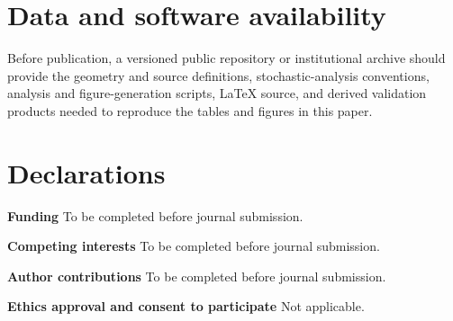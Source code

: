 \documentclass[11pt]{article}
\begin{document}
\section*{Data and software availability}
Before publication, a versioned public repository or institutional archive should provide the geometry and source definitions, stochastic-analysis conventions, analysis and figure-generation scripts, LaTeX source, and derived validation products needed to reproduce the tables and figures in this paper.

\section*{Declarations}
\textbf{Funding} To be completed before journal submission.

\textbf{Competing interests} To be completed before journal submission.

\textbf{Author contributions} To be completed before journal submission.

\textbf{Ethics approval and consent to participate} Not applicable.
\end{document}
